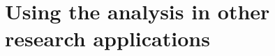 \chapter{Using the analysis in other research applications}
\label{in:consumers}
\label{exec13:i3-start}





\label{exec13:i3-end}
